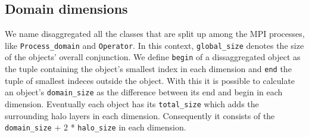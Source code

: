 \subsection{Domain dimensions}
\label{section_shape_dom_dims}
We name disaggregated all the classes that are split up among the MPI processes, like \verb|Process_domain| and \verb|Operator|. In this context, \verb|global_size| denotes the size of the objects' overall conjunction. We define \verb|begin| of a dissaggregated object as the tuple containing the object's smallest index in each dimension and \verb|end| the tuple of smallest indeces outside the object. With this it is possible to calculate an object's \verb|domain_size| as the difference between its end and begin in each dimension. Eventually each object has its \verb|total_size| which adds the surrounding halo layers in each dimension. Consequently it consists of the \verb|domain_size| + 2 * \verb|halo_size| in each dimension.

